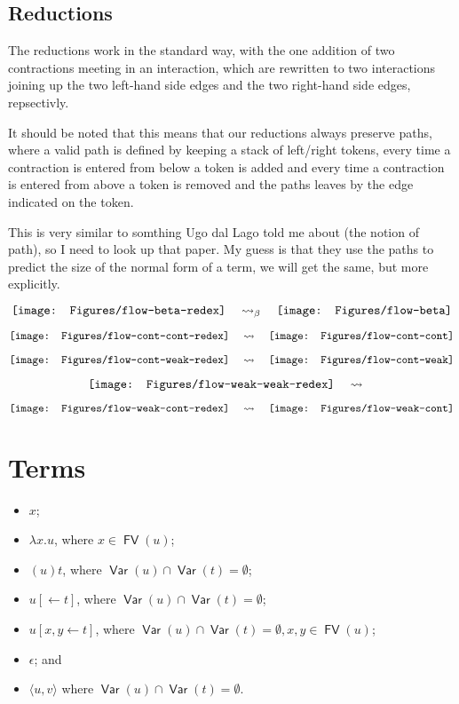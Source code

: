 \documentclass[11pt,a4paper]{article}
\theoremstyle{definition}
\theoremstyle{plain}
\theoremstyle{remark}
\begin{document}
\subsection{Reductions}

The reductions work in the standard way, with the one addition of two contractions meeting in an interaction, which are rewritten to two interactions joining up the two left-hand side edges and the two right-hand side edges, repsectivly.

It should be noted that this means that our reductions always preserve paths, where a valid path is defined by keeping a stack of left/right tokens, every time a contraction is entered from below a token is added and every time a contraction is entered from above a token is removed and the paths leaves by the edge indicated on the token.

This is very similar to somthing Ugo dal Lago told me about (the notion of path), so I need to look up that paper. My guess is that they use the paths to predict the size of the normal form of a term, we will get the same, but more explicitly.

\[
\vcenter{\hbox{\texttt{[image: Figures/flow-beta-redex]}}}
\quad\rightsquigarrow_\beta\quad
\vcenter{\hbox{\texttt{[image: Figures/flow-beta]}}}
\]

\[
\vcenter{\hbox{\texttt{[image: Figures/flow-cont-cont-redex]}}}
\quad\rightsquigarrow\quad
\vcenter{\hbox{\texttt{[image: Figures/flow-cont-cont]}}}
\]

\[
\vcenter{\hbox{\texttt{[image: Figures/flow-cont-weak-redex]}}}
\quad\rightsquigarrow\quad
\vcenter{\hbox{\texttt{[image: Figures/flow-cont-weak]}}}
\]

\[
\vcenter{\hbox{\texttt{[image: Figures/flow-weak-weak-redex]}}}
\quad\rightsquigarrow\quad
\]

\[
\vcenter{\hbox{\texttt{[image: Figures/flow-weak-cont-redex]}}}
\quad\rightsquigarrow\quad
\vcenter{\hbox{\texttt{[image: Figures/flow-weak-cont]}}}
\]

\section{Terms}

\newcommand{\FV}{{\mathop{\mathsf{FV}}}}
\newcommand{\Var}{{\mathop{\mathsf{Var}}}}

\begin{itemize}
	\item $x$;
	\item $\lambda x.u$, where $x\in\FV(u)$;
	\item $(u)t$, where $\Var(u)\cap\Var(t)=\emptyset$;
	\item $u[\leftarrow t]$, where $\Var(u)\cap\Var(t)=\emptyset$;
	\item $u[x,y\leftarrow t]$, where $\Var(u)\cap\Var(t)=\emptyset, x,y\in\FV(u)$;
	\item $\epsilon$; and
	\item $\langle u,v\rangle$ where $\Var(u)\cap\Var(t)=\emptyset$.
\end{itemize}
\end{document}

